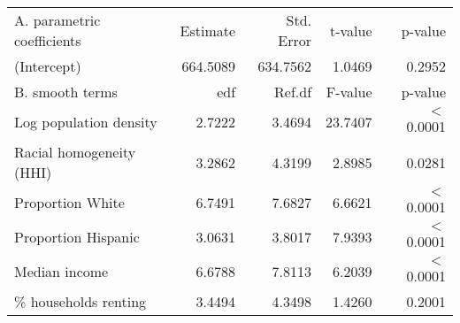 \begin{table}[ht]
\centering
\begin{tabular}{lrrrr}
   \hline
A. parametric coefficients & Estimate & Std. Error & t-value & p-value \\ 
  (Intercept) & 664.5089 & 634.7562 & 1.0469 & 0.2952 \\ 
   \hline
B. smooth terms & edf & Ref.df & F-value & p-value \\ 
  Log population density & 2.7222 & 3.4694 & 23.7407 & $<$ 0.0001 \\ 
  Racial homogeneity (HHI) & 3.2862 & 4.3199 & 2.8985 & 0.0281 \\ 
  Proportion White & 6.7491 & 7.6827 & 6.6621 & $<$ 0.0001 \\ 
  Proportion Hispanic & 3.0631 & 3.8017 & 7.9393 & $<$ 0.0001 \\ 
  Median income & 6.6788 & 7.8113 & 6.2039 & $<$ 0.0001 \\ 
  \% households renting & 3.4494 & 4.3498 & 1.4260 & 0.2001 \\ 
   \hline
\end{tabular}
\caption{ } 
\label{Demographic GAM}
\end{table}
